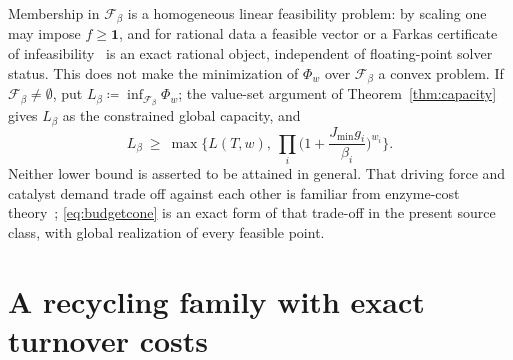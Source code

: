\documentclass[11pt,a4paper]{article}
\theoremstyle{plain}
\theoremstyle{definition}
\theoremstyle{remark}
\numberwithin{equation}{section}
\newcommand{\one}{\mathbf{1}}
\newcommand{\cone}{\mathcal{F}}
\newcommand{\Jmin}{J_{\min}}
\begin{document}
Membership in $\cone_\beta$ is a homogeneous linear feasibility problem: by scaling one may impose $f\ge\one$, and for rational data a feasible vector or a Farkas certificate of infeasibility~\citep{schrijver1986} is an exact rational object, independent of floating-point solver status. This does not make the minimization of $\Phi_w$ over $\cone_\beta$ a convex problem. If $\cone_\beta\ne\emptyset$, put $L_\beta\coloneqq\inf_{\cone_\beta}\Phi_w$; the value-set argument of Theorem~\ref{thm:capacity} gives $L_\beta$ as the constrained global capacity, and
\begin{equation}\label{eq:budgetlower}
 L_\beta\ \ge\ \max\Big\{L(T,w),\ \prod_i\Big(1+\frac{\Jmin g_i}{\beta_i}\Big)^{w_i}\Big\}.
\end{equation}
Neither lower bound is asserted to be attained in general. That driving force and catalyst demand trade off against each other is familiar from enzyme-cost theory~\citep{flamholz2013,noor2014,noor2016}; \eqref{eq:budgetcone} is an exact form of that trade-off in the present source class, with global realization of every feasible point.

\section{A recycling family with exact turnover costs}\label{sec:recycling}
\end{document}

